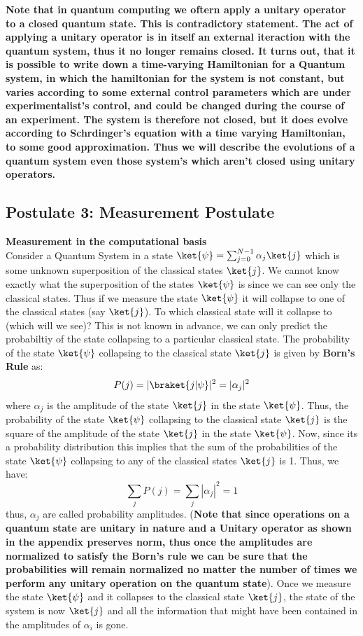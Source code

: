 \documentclass[12pt, oneside]{book}
\theoremstyle{definition}
\theoremstyle{definition}
\theoremstyle{remark}
\begin{document}
\textbf{Note that in quantum computing we oftern apply a unitary operator to a closed quantum state. This is contradictory statement.
The act of applying a unitary operator is in itself an external iteraction with the quantum system, thus it no longer remains closed. 
It turns out, that it is possible to write down a time-varying Hamiltonian for a Quantum system, in which the hamiltonian for the system is not constant,
but varies according to some external control parameters which are under experimentalist's control, and could be changed during the 
course of an experiment. The system is therefore not closed, but it does evolve according to Schrdinger's equation with a time varying Hamiltonian, to some good
approximation. Thus we will describe the evolutions of a quantum system even those system's which aren't closed using unitary operators.}

\subsection{Postulate 3: Measurement Postulate}
\textbf{Measurement in the computational basis}\\
Consider a Quantum System in a state $\ket{\psi} = \sum_{j=0}^{N-1} \alpha_j \ket{j}$ which is some unknown superposition of the classical states $\ket{j}$. We cannot know exactly what the superposition of the states $\ket{\psi}$ is
since we can see only the classical states. Thus if we measure the state $\ket{\psi}$ it will collapse to one of the classical states
(say $\ket{j}$). To which classical state will it collapse to (which will we see)? This is not known in advance, we can
only predict the probabiltiy of the state collapsing to a particular classical state. The probability of the state $\ket{\psi}$ collapsing to the classical state $\ket{j}$ is given by
\textbf{Born's Rule} as:
\[
    P(j)=|\braket{j|\psi}|^2=|\alpha_j|^2
\]
where $\alpha_j$ is the amplitude of the state $\ket{j}$ in the state $\ket{\psi}$. Thus, the probability of the state $\ket{\psi}$ collapsing to the classical state $\ket{j}$ is the square of the amplitude of the state $\ket{j}$ in the state $\ket{\psi}$.
Now, since its a probability distribution this implies that the sum of the probabilities of the state $\ket{\psi}$ collapsing to any of the classical states $\ket{j}$ is 1. Thus, we have:
\[
    \sum_{j}P(j)=\sum_{j}|\alpha_j|^2=1
\]
thus, $\alpha_j$ are called probability amplitudes. (\textbf{Note that since operations on a quantum state are unitary in nature and 
a Unitary operator as shown in the appendix preserves norm, thus once the amplitudes are normalized to satisfy the Born's rule we can be sure that the probabilities will remain normalized no matter the number
of times we perform any unitary operation on the quantum state}). Once we measure the state 
$\ket{\psi}$ and it collapses to the classical state $\ket{j}$, the state of the system is now $\ket{j}$ and all the information that might have been contained in the amplitudes of $\alpha_i$ is gone.
\end{document}
